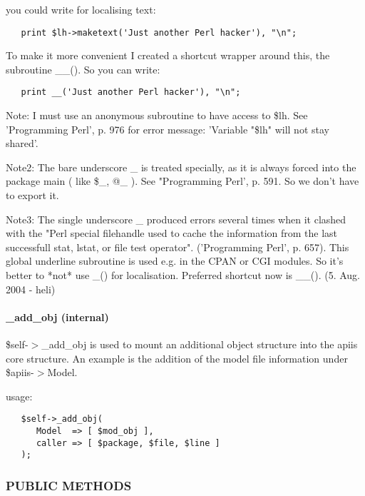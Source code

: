 you could write for localising text:

\begin{verbatim}
   print $lh->maketext('Just another Perl hacker'), "\n";
\end{verbatim}


To make it more convenient I created a shortcut wrapper around this,
the subroutine \_\_(). So you can write:

\begin{verbatim}
   print __('Just another Perl hacker'), "\n";
\end{verbatim}


Note: I must use an anonymous subroutine to have access to \$lh. See
'Programming Perl', p. 976 for error message: 'Variable "\$lh" will not stay
shared'.



Note2: The bare underscore \_ is treated specially, as it is always forced into
the package main ( like \$\_, @\_ ). See "Programming Perl', p. 591.
So we don't have to export it.



Note3: The single underscore \_ produced errors several times when it clashed
with the "Perl special filehandle used to cache the information from the
last successfull stat, lstat, or file test operator". ('Programming Perl',
p. 657).
This global underline subroutine is used e.g. in the CPAN or CGI modules. So
it's better to *not* use \_() for localisation. Preferred shortcut now is
\_\_().  (5. Aug. 2004 - heli)

\paragraph*{\_add\_obj (internal)\label{Apiis::Init_--_Basic_initialisation_object_for_the_complete_APIIS_structure__add_obj_internal_}}


\$self-$>$\_add\_obj is used to mount an additional object structure into the
apiis core structure. An example is the addition of the model file
information under \$apiis-$>$Model.



usage:

\begin{verbatim}
   $self->_add_obj(
      Model  => [ $mod_obj ],
      caller => [ $package, $file, $line ]
   );
\end{verbatim}
\subsubsection*{PUBLIC METHODS\label{Apiis::Init_--_Basic_initialisation_object_for_the_complete_APIIS_structure_PUBLIC_METHODS}}
